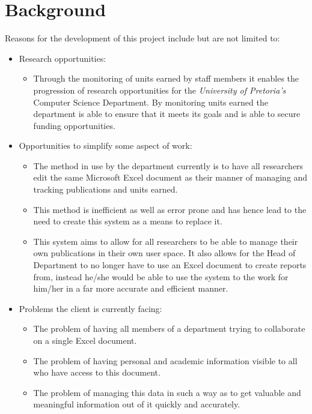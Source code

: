 \documentclass{article}
\begin{document}
	\section{Background}\label{sec:background}
		Reasons for the development of this project include but are not limited to:
		\begin{itemize}
			\item Research opportunities:
			\begin{itemize}
				\item Through the monitoring of units earned by staff members it enables the progression of research opportunities for the \textit{University of Pretoria's} Computer Science Department. By monitoring units earned the department is able to ensure that it meets its goals and is able to secure funding opportunities.
			\end{itemize}
			\item Opportunities to simplify some aspect of work:
			\begin{itemize}
				\item The method in use by the department currently is to have all researchers edit the same Microsoft Excel document as their manner of managing and tracking publications and units earned.
				\item This method is inefficient as well as error prone and has hence lead to the need to create this system as a means to replace it.
				\item This system aims to allow for all researchers to be able to manage their own publications in their own user space. It also allows for the Head of Department to no longer have to use an Excel document to create reports from, instead he/she would be able to use the system to the work for him/her in a far more accurate and efficient manner.
			\end{itemize}
			\item Problems the client is currently facing:
			\begin{itemize}
				\item The problem of having all members of a department trying to collaborate on a single Excel document.
				\item The problem of having personal and academic information visible to all who have access to this document.
				\item The problem of managing this data in such a way as to get valuable and meaningful information out of it quickly and accurately.
			\end{itemize}
		\end{itemize}
		
\end{document}
